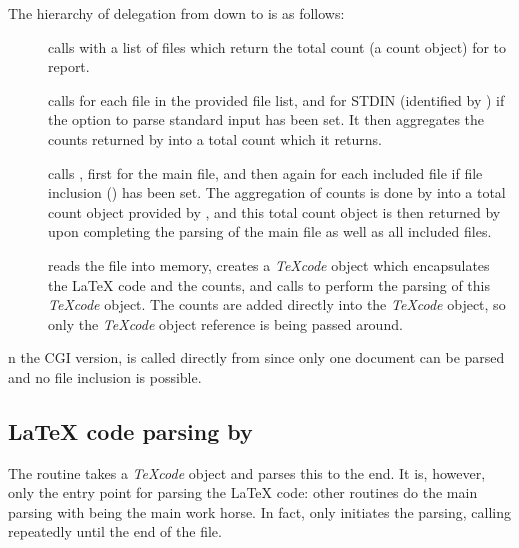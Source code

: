 \documentclass{article}
\newcommand\Obj[1]{\textsl{#1}}
\def\CGI#1\CGIend{#1} %
\def\CGIend{}
\begin{document}
The hierarchy of delegation from  down to  is as follows:

\begin{description}

\item[] calls  with a list of files which return the total count (a count object) for  to report.

\item[] calls  for each file in the provided file list, and for STDIN (identified by ) if the option to parse standard input has been set. It then aggregates the counts returned by  into a total count which it returns.

\item[] calls , first for the main file, and then again for each included file if file inclusion () has been set. The aggregation of counts is done by  into a total count object provided by , and this total count object is then returned by  upon completing the parsing of the main file as well as all included files.

\item[] reads the file into memory, creates a \Obj{TeXcode} object which encapsulates the \LaTeX{} code and the counts, and calls  to perform the parsing of this \Obj{TeXcode} object. The counts are added directly into the \Obj{TeXcode} object, so only the \Obj{TeXcode} object reference is being passed around.

\end{description}

\CGI
In the CGI version,  is called directly from  since only one document can be parsed and no file inclusion is possible.
\CGIend


\subsection{\LaTeX{} code parsing by }

The  routine takes a \Obj{TeXcode} object and parses this to the end. It is, however, only the entry point for parsing the \LaTeX{} code: other routines do the main parsing with  being the main work horse. In fact,  only initiates the parsing, calling  repeatedly until the end of the file.
\end{document}
